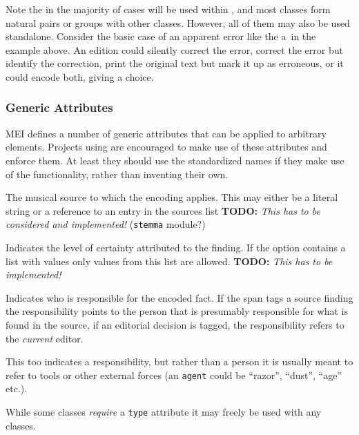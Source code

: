 \documentclass[]{ollmanual}
\begin{document}
Note the in the majority of cases  will be used
within , and most classes form natural pairs or groups with
other classes. However, all of them may also be used standalone.
Consider the basic case of an apparent error like the a\flat~in the
example above. An edition could silently correct the error, correct the
error but identify the correction, print the original text but mark it
up as erroneous, or it could encode both, giving a choice.

\hypertarget{generic-attributes}{%
\subsubsection{Generic Attributes}\label{generic-attributes}}

MEI defines a number of generic attributes that can be applied to
arbitrary elements. Projects using
 are encouraged to make use of
these attributes and enforce them. At least they should use the
standardized names if they make use of the functionality, rather than
inventing their own.


The musical source to which the encoding applies. This may either be a
literal string or a reference to an entry in the sources list
\textbf{TODO:} \emph{This has to be considered and implemented!}
(\texttt{stemma} module?)


Indicates the level of certainty attributed to the finding. If the
option  contains a list with values
only values from this list are allowed. \textbf{TODO:} \emph{This has to
be implemented!}


Indicates who is responsible for the encoded fact. If the span tags a
source finding the responsibility points to the person that is
presumably responsible for what is found in the source, if an editorial
decision is tagged, the responsibility refers to the \emph{current}
editor.


This too indicates a responsibility, but rather than a person it is
usually meant to refer to tools or other external forces (an
\texttt{agent} could be ``razor'', ``dust'', ``age'' etc.).


While some classes \emph{require} a \texttt{type} attribute it may
freely be used with any classes.
\end{document}
